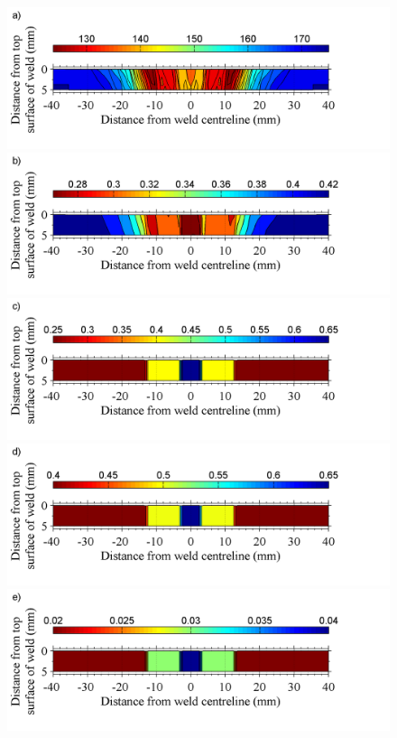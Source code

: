 \begin{figure}
	\centering
	\includegraphics[width=1\linewidth]{JCHValtered}
	\includegraphics[width=1\linewidth]{JCAaltered}
	\includegraphics[width=1\linewidth]{JCBaltered}
	\includegraphics[width=1\linewidth]{JCnaltered}
	\includegraphics[width=1\linewidth]{JCCaltered}

\end{figure}
